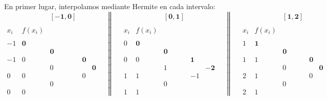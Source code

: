 \begin{ejercicio}
    En primer lugar, interpolamos mediante Hermite en cada intervalo:
    \begin{equation*}
        \begin{array}{c|cccc}
            &&\mathbf{[-1, 0]} \\ \\
            x_i & f(x_i) \\ \\
            -1 & \mathbf{0} \\
            && \mathbf{0}\\
            -1 & 0 && \mathbf{0}\\
            && 0 && \mathbf{0}\\ 
            0 & 0 && 0\\
            && 0\\
            0 & 0
        \end{array}
        \quad \left\|\quad
        \begin{array}{c|cccc}
            &&\mathbf{[0,1]} \\ \\
            x_i & f(x_i) \\ \\
            0 & \mathbf{0} \\
            && \mathbf{0}\\
            0 & 0 && \mathbf{1}\\
            && 1 && \mathbf{-2}\\ 
            1 & 1 && -1\\
            && 0\\
            1 & 1
        \end{array}\right.
        \quad \left\|\quad
        \begin{array}{c|cccc}
            &&\mathbf{[1,2]} \\ \\
            x_i & f(x_i) \\ \\
            1 & \mathbf{1} \\
            && \mathbf{0}\\
            1 & 1 && \mathbf{0}\\
            && 0 && \mathbf{0}\\ 
            2 & 1 && 0\\
            && 0\\
            2 & 1
        \end{array}\right.
    \end{equation*}


\end{ejercicio}
